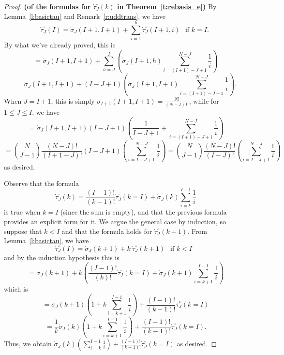 \documentclass[11pt]{amsart}   %
\theoremstyle{definition}
\theoremstyle{remark}
\numberwithin{equation}{section}
\theoremstyle{theorem}
\begin{document}
\begin{proof}{\bf (of the formulas for $\dot\tau^\circ_J(k)$ in Theorem~\ref{t:rebasis_e})}
By Lemma~\ref{l:basictau} and Remark~\ref{r:uddtrans}, we have
\[ \dot\tau^\circ_J(I) = \dot\sigma_J(I+1, I+1) + \sum_{i=1}^{k} \dot\tau^\circ_J(I+1, i) \ \ \text{ if $k = I$. } \]
By what we've already proved, this is
\[ = \dot\sigma_J(I+1,I+1) + \sum_{h=J}^{I} \left( \dot\sigma_J(I+1, h) \sum_{i=(I+1)-J+1}^{N-J} \frac{1}{i} \right) \]
\[ = \dot\sigma_J(I+1,I+1) + (I-J+1) \left( \dot\sigma_J(I+1, I+1) \sum_{i=(I+1)-J+1}^{N-J} \frac{1}{i} \right). \]
When $J=I+1$, this is simply $\dot\sigma_{I+1}(I+1,I+1) = \frac{N!}{(N-I) I!}$, while for $1 \leq J \leq I$, we have
\[ = \dot\sigma_J(I+1,I+1)  (I-J+1) \left( \frac{1}{I-J+1} + \sum_{i=(I+1)-J+1}^{N-J} \frac{1}{i} \right) \]
\[ = {N \choose {J-1}} \frac{(N-J)!}{(I+1-J)!} (I-J+1) \left( \sum_{i=I-J+1}^{N-J} \frac{1}{i} \right) = {N \choose {J-1}} \frac{(N-J)!}{(I-J)!} \left( \sum_{i=I-J+1}^{N-J} \frac{1}{i} \right) \]
as desired. 

Observe that the formula
\[ \dot\tau^\circ_J(k) = \frac{(I-1)!}{(k-1)!} \dot\tau^\circ_J(k=I) + \dot\sigma_J(k) \sum_{i=k}^{I-1} \frac{1}{i} \]
is true when $k = I$ (since the sum is empty), and that the previous formula provides an explicit form for it.
We argue the general case by induction, so suppose that $k < I$ and that the formula holds for $\dot\tau^\circ_J(k+1)$.
From Lemma~\ref{l:basictau}, we have
\[ \dot\tau^\circ_J(I) = \dot\sigma_J(k+1) + k \ \dot\tau^\circ_J(k+1) \ \ \text{ if $k < I$ } \]
and by the induction hypothesis this is
\[  = \dot\sigma_J(k+1) + k \left( \frac{(I-1)!}{(k)!} \dot\tau^\circ_J(k=I) + \dot\sigma_J(k+1) \sum_{i=k+1}^{I-1} \frac{1}{i} \right) \]
which is
\[  = \dot\sigma_J(k+1) \left(1 + k \sum_{i=k+1}^{I-1} \frac{1}{i}\right) + \frac{(I-1)!}{(k-1)!} \dot\tau^\circ_J(k=I) \]
\[  = \frac{1}{k} \dot\sigma_J(k) \left(1 + k \sum_{i=k+1}^{I-1} \frac{1}{i}\right) + \frac{(I-1)!}{(k-1)!} \dot\tau^\circ_J(k=I). \]
Thus, we obtain $\dot\sigma_J(k) \left(\sum_{i=k}^{I-1} \frac{1}{i}\right) + \frac{(I-1)!}{(k-1)!} \dot\tau^\circ_J(k=I)$ as desired.
\end{proof}
\end{document}
